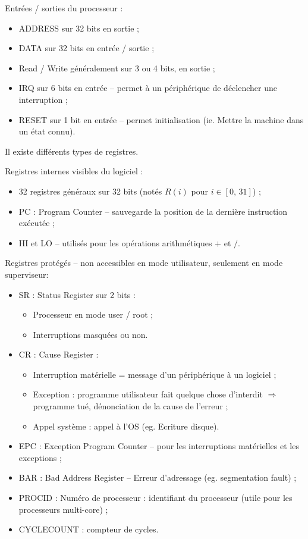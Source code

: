 \documentclass[11pt,english,french]{scrreprt}
\theoremstyle{remark}
\theoremstyle{definition}
\begin{document}
Entrées / sorties du processeur :\begin{itemize}
	\item ADDRESS sur 32 bits en sortie ;
	\item DATA sur 32 bits en entrée / sortie ;
	\item Read / Write généralement sur 3 ou 4 bits, en sortie ;
	\item IRQ sur 6 bits en entrée -- permet à un périphérique de déclencher une interruption ;
	\item RESET sur 1 bit en entrée -- permet initialisation (ie. Mettre la machine dans un état connu).
\end{itemize}

\vspace{10pt}

Il existe différents types de registres.

Registres internes visibles du logiciel :\begin{itemize}
	\item 32 registres généraux sur 32 bits (notés $R(i)$ pour $i\in[0,\,31]$) ;
	\item PC : Program Counter -- sauvegarde la position de la dernière instruction exécutée ;
	\item HI et LO -- utilisés pour les opérations arithmétiques $+$ et $/$. 
\end{itemize}

\vspace{10pt}

Registres protégés -- non accessibles en mode utilisateur, seulement en mode superviseur:\begin{itemize}
	\item SR : Status Register sur 2 bits :\begin{itemize}
		\item Processeur en mode user / root ;
		\item Interruptions masquées ou non.
	\end{itemize}
	\item CR : Cause Register :\begin{itemize}
		\item Interruption matérielle = message d'un périphérique à un logiciel ;
		\item Exception : programme utilisateur fait quelque chose d'interdit $\Rightarrow$ programme tué, dénonciation de la cause de l'erreur ;
		\item Appel système : appel à l'OS (eg. Ecriture disque).
	\end{itemize}
	\item EPC : Exception Program Counter -- pour les interruptions matérielles et les exceptions ;
	\item BAR : Bad Address Register -- Erreur d'adressage (eg. segmentation fault) ;
	\item PROCID : Numéro de processeur : identifiant du processeur (utile pour les processeurs multi-core) ;
	\item CYCLECOUNT : compteur de cycles.
\end{itemize}
\end{document}
